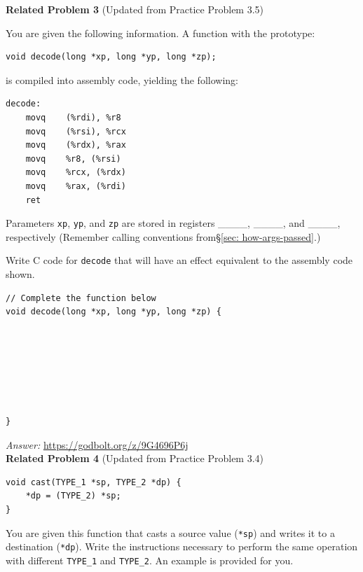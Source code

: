 \documentclass{article}
\begin{document}
\noindent\textbf{Related Problem 3} (Updated from Practice Problem 3.5)

\vspace{5pt}

You are given the following information. A function with the prototype:

\begin{lstlisting}[basicstyle=\ttfamily, frame=none]
void decode(long *xp, long *yp, long *zp);
\end{lstlisting}

is compiled into assembly code, yielding the following:

\begin{lstlisting}[basicstyle=\ttfamily, frame=none]
decode:
    movq    (%rdi), %r8
    movq    (%rsi), %rcx
    movq    (%rdx), %rax
    movq    %r8, (%rsi)
    movq    %rcx, (%rdx)
    movq    %rax, (%rdi)
    ret
\end{lstlisting}

\vspace{5pt}

Parameters \texttt{xp}, \texttt{yp}, and \texttt{zp} are stored in registers \_\_\_\_, \_\_\_\_, and \_\_\_\_, respectively (Remember calling conventions from\S\ref{sec: how-args-passed}.)

\vspace{5pt}

Write C code for \texttt{decode} that will have an effect equivalent to the assembly code shown.\\
\begin{lstlisting}[basicstyle=\ttfamily, frame=none]
// Complete the function below
void decode(long *xp, long *yp, long *zp) {







}
\end{lstlisting}
\textit{Answer: }\url{https://godbolt.org/z/9G4696P6j} \\
\clearpage
\noindent\textbf{Related Problem 4} (Updated from Practice Problem 3.4)

\begin{lstlisting}
void cast(TYPE_1 *sp, TYPE_2 *dp) {
    *dp = (TYPE_2) *sp;
}
\end{lstlisting}

You are given this function that casts a source value (\texttt{*sp}) and writes it to a destination (\texttt{*dp}). Write the instructions necessary to perform the same operation with different \texttt{TYPE\_1} and \texttt{TYPE\_2}. An example is provided for you.
\end{document}
